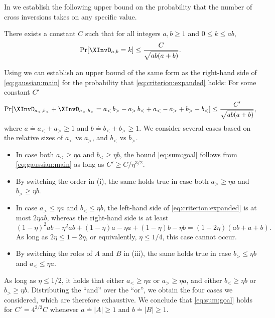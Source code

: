 \documentclass{toc}
\begin{document}
In  we establish the following upper bound on the probability that the number of cross inversions takes on any specific value.
\begin{lemma}\label{thm:gaussian:main}
There exists a constant $C$ such that for all integers $a,b\ge 1$ and $0\le k\le ab$, 
\begin{equation}\label{eq:gaussian:main}
\Pr[\XInvD_{a,b}=k]\le \frac{C}{\sqrt{ab(a+b)}}. 
\end{equation}
\end{lemma}
Using  we can establish an upper bound of the same form as the right-hand side of \eqref{eq:gaussian:main} for the probability that \eqref{eq:criterion:expanded} holds: For some constant $C'$
\begin{equation}\label{eq:sum:goal}
\Pr[ \XInvD_{a_<,b_<} + \XInvD_{a_>,b_>} = a_< \, b_> - a_> \, b_< + a_< - a_> + b_> - b_<] \le \frac{C'}{\sqrt{ab(a+b)}}, 
\end{equation}
where $a \doteq a_< + a_> \ge 1$ and $b \doteq b_< + b_> \ge 1$.
We consider several cases based on the relative sizes of $a_<$ vs $a_>$, and $b_<$ vs $b_>$.
\begin{itemize}
\item[(i)] In case both $a_< \ge \eta a$ and $b_< \ge \eta b$, the bound \eqref{eq:sum:goal} follows from \eqref{eq:gaussian:main} as long as $C' \ge C / \eta^{3/2}$. 
\item[(ii)] By switching the order in (i), the same holds true in case both $a_> \ge \eta a$ and $b_> \ge \eta b$.
\item[(iii)] In case $a_> \le \eta a$ and $b_< \le \eta b$, the left-hand side of \eqref{eq:criterion:expanded} is at most $2 \eta ab$, whereas the right-hand side is at least
\[ (1-\eta)^2 ab - \eta^2 ab + (1-\eta)a - \eta a + (1-\eta)b - \eta b 
= (1-2\eta)(ab+a+b). \]
As long as $2 \eta \le 1-2\eta$, or equivalently, $\eta \le 1/4$, this case cannot occur.
\item[(iv)] By switching the roles of $A$ and $B$ in (iii), the same holds true in case $b_> \le \eta b$ and $a_< \le \eta a$.
\end{itemize}
As long as $\eta \le 1/2$, it holds that either $a_< \ge \eta a$ or $a_> \ge \eta a$, and either $b_< \ge \eta b$ or $b_> \ge \eta b$. 
Distributing the “and” over the “or”, we obtain the four cases we considered, which are therefore exhaustive. We conclude that \eqref{eq:sum:goal} holds for $C' = 4^{3/2} C$ whenever $a \doteq |A| \ge 1$ and $b \doteq |B| \ge 1$. 
\end{document}
